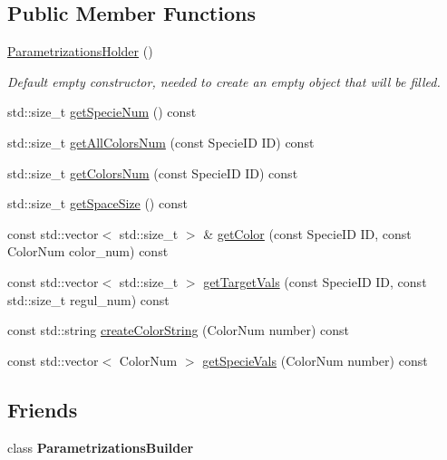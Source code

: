 \subsection*{\-Public \-Member \-Functions}
\begin{DoxyCompactItemize}
\item 
\hypertarget{classParametrizationsHolder_a3816cd8b510cc5a96da90adca4ff1077}{\hyperlink{classParametrizationsHolder_a3816cd8b510cc5a96da90adca4ff1077}{\-Parametrizations\-Holder} ()}\label{classParametrizationsHolder_a3816cd8b510cc5a96da90adca4ff1077}

\begin{DoxyCompactList}\small\item\em \-Default empty constructor, needed to create an empty object that will be filled. \end{DoxyCompactList}\item 
std\-::size\-\_\-t \hyperlink{classParametrizationsHolder_a20920a6cdec5de6d3dcaf7e10c59430c}{get\-Specie\-Num} () const 
\item 
std\-::size\-\_\-t \hyperlink{classParametrizationsHolder_a7ad5ebfb7e5a52896b9a7ae541e3d7e2}{get\-All\-Colors\-Num} (const \-Specie\-I\-D \-I\-D) const 
\item 
std\-::size\-\_\-t \hyperlink{classParametrizationsHolder_a7c1b8e98b4eef781c2e1915ceb036b0e}{get\-Colors\-Num} (const \-Specie\-I\-D \-I\-D) const 
\item 
std\-::size\-\_\-t \hyperlink{classParametrizationsHolder_a25073b9f8a1fa65ef34078488717c3b6}{get\-Space\-Size} () const 
\item 
const std\-::vector$<$ std\-::size\-\_\-t $>$ \& \hyperlink{classParametrizationsHolder_aa5e1039bfb6ef7e46e628a68f5017b5b}{get\-Color} (const \-Specie\-I\-D \-I\-D, const \-Color\-Num color\-\_\-num) const 
\item 
const std\-::vector$<$ std\-::size\-\_\-t $>$ \hyperlink{classParametrizationsHolder_ae1be2f9c2408501150c5eba52d136d60}{get\-Target\-Vals} (const \-Specie\-I\-D \-I\-D, const std\-::size\-\_\-t regul\-\_\-num) const 
\item 
const std\-::string \hyperlink{classParametrizationsHolder_ab7ac8a8c80e9acb38983ebf478749bd9}{create\-Color\-String} (\-Color\-Num number) const 
\item 
const std\-::vector$<$ \-Color\-Num $>$ \hyperlink{classParametrizationsHolder_a2705dfd955aacf9aa54c8a08d078b132}{get\-Specie\-Vals} (\-Color\-Num number) const 
\end{DoxyCompactItemize}
\subsection*{\-Friends}
\begin{DoxyCompactItemize}
\item 
\hypertarget{classParametrizationsHolder_a99090b061b96efab6a781286b8e5975b}{class {\bfseries \-Parametrizations\-Builder}}\label{classParametrizationsHolder_a99090b061b96efab6a781286b8e5975b}

\end{DoxyCompactItemize}


